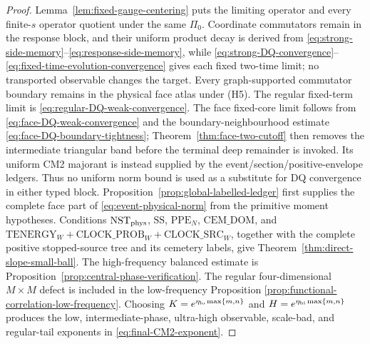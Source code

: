 \documentclass[11pt]{article}
\begin{document}
\begin{proof}
Lemma~\ref{lem:fixed-gauge-centering} puts the limiting operator and every
finite-$s$ operator quotient under the same $\Pi_0$.  Coordinate
commutators remain in the response block, and their uniform product decay is
derived from \eqref{eq:strong-side-memory}--\eqref{eq:response-side-memory},
while \eqref{eq:strong-DQ-convergence}--
\eqref{eq:fixed-time-evolution-convergence} gives each fixed two-time limit; no
transported observable changes the target.  Every graph-supported
commutator boundary remains in the physical face atlas under \textup{(H5)}.
The regular fixed-term limit is
\eqref{eq:regular-DQ-weak-convergence}.  The face fixed-core limit follows
from \eqref{eq:face-DQ-weak-convergence} and the boundary-neighbourhood
estimate \eqref{eq:face-DQ-boundary-tightness};
Theorem~\ref{thm:face-two-cutoff} then removes the intermediate triangular
band before the terminal deep remainder is invoked.  Its uniform CM2
majorant is instead supplied by the event/section/positive-envelope ledgers.
Thus no
uniform norm bound is used as a substitute for DQ convergence in either
typed block.
Proposition~\ref{prop:global-labelled-ledger} first supplies the complete face
part of \eqref{eq:event-physical-norm} from the primitive moment hypotheses.
Conditions $\mathrm{NST}_{\rm phys}$, $\mathrm{SS}$,
$\mathrm{PPE}_{N}$, $\mathrm{CEM\_DOM}$, and
$\mathrm{TENERGY}_{W}+\mathrm{CLOCK\_PROB}_{W}
+\mathrm{CLOCK\_SRC}_{W}$, together with the complete
positive stopped-source tree and its cemetery labels, give
Theorem~\ref{thm:direct-slope-small-ball}.  The high-frequency balanced
estimate is Proposition~\ref{prop:central-phase-verification}.  The regular
four-dimensional $M\times M$ defect is included in the low-frequency Proposition
\ref{prop:functional-correlation-low-frequency}.  Choosing
$K=e^{\eta_{\rm lo}\max\{m,n\}}$ and
$H=e^{\eta_{\rm hi}\max\{m,n\}}$ produces the low, intermediate-phase,
ultra-high observable, scale-bad, and regular-tail exponents in
\eqref{eq:final-CM2-exponent}.


\end{proof}
\end{document}
